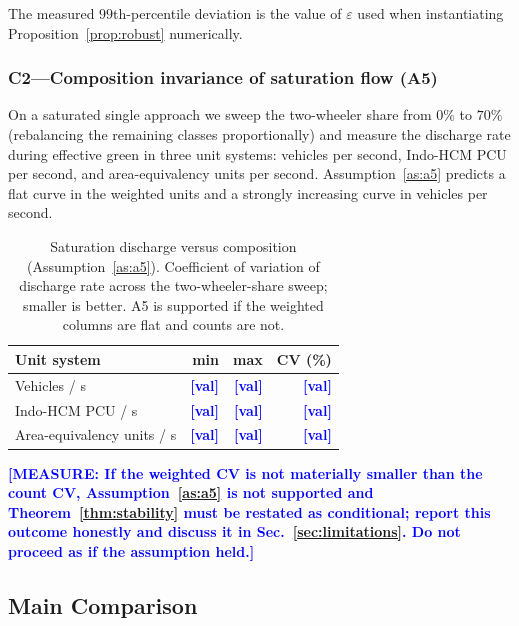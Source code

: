 \documentclass[journal]{IEEEtran}
\newcommand{\note}[1]{\textcolor{blue}{\textbf{[MEASURE: #1]}}}
\newcommand{\pl}{\textcolor{blue}{\textbf{[val]}}}
\begin{document}
The measured $99$th-percentile deviation is the value of $\varepsilon$
used when instantiating Proposition~\ref{prop:robust} numerically.

\subsubsection{C2---Composition invariance of saturation flow (A5)}
On a saturated single approach we sweep the two-wheeler share from $0\%$
to $70\%$ (rebalancing the remaining classes proportionally) and measure
the discharge rate during effective green in three unit systems: vehicles
per second, Indo-HCM PCU per second, and area-equivalency units per
second. Assumption~\ref{as:a5} predicts a flat curve in the weighted
units and a strongly increasing curve in vehicles per second.

\begin{table}[htbp]
\caption{Saturation discharge versus composition (Assumption~\ref{as:a5}).
Coefficient of variation of discharge rate across the two-wheeler-share
sweep; smaller is better. A5 is supported if the weighted columns are
flat and counts are not.}
\label{tab:calib_a5}
\centering
\footnotesize
\begin{tabularx}{\columnwidth}{@{}Xrrr@{}}
\toprule
Unit system & min & max & CV (\%) \\
\midrule
Vehicles / s                     & \pl & \pl & \pl \\
Indo-HCM PCU / s                 & \pl & \pl & \pl \\
Area-equivalency units / s       & \pl & \pl & \pl \\
\bottomrule
\end{tabularx}
\end{table}

\note{If the weighted CV is not materially smaller than the count CV,
Assumption~\ref{as:a5} is not supported and Theorem~\ref{thm:stability}
must be restated as conditional; report this outcome honestly and discuss
it in Sec.~\ref{sec:limitations}. Do not proceed as if the assumption
held.}

\subsection{Main Comparison}
\label{subsec:main}
\end{document}
